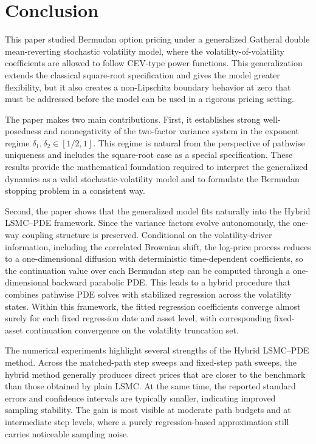 \documentclass[pdflatex,sn-mathphys-num]{sn-jnl}
\theoremstyle{thmstyleone}%
\theoremstyle{thmstylethree}%
\theoremstyle{thmstyletwo}%
\begin{document}
\section{Conclusion}\label{sec:conclusion}
This paper studied Bermudan option pricing under a generalized Gatheral double mean-reverting stochastic volatility model, where the volatility-of-volatility coefficients are allowed to follow CEV-type power functions. This generalization extends the classical square-root specification and gives the model greater flexibility, but it also creates a non-Lipschitz boundary behavior at zero that must be addressed before the model can be used in a rigorous pricing setting.

The paper makes two main contributions. First, it establishes strong well-posedness and nonnegativity of the two-factor variance system in the exponent regime $\delta_1, \delta_2 \in [1/2,1]$. This regime is natural from the perspective of pathwise uniqueness and includes the square-root case as a special specification. These results provide the mathematical foundation required to interpret the generalized dynamics as a valid stochastic-volatility model and to formulate the Bermudan stopping problem in a consistent way.

Second, the paper shows that the generalized model fits naturally into the Hybrid LSMC--PDE framework. Since the variance factors evolve autonomously, the one-way coupling structure is preserved. Conditional on the volatility-driver information, including the correlated Brownian shift, the log-price process reduces to a one-dimensional diffusion with deterministic time-dependent coefficients, so the continuation value over each Bermudan step can be computed through a one-dimensional backward parabolic PDE. This leads to a hybrid procedure that combines pathwise PDE solves with stabilized regression across the volatility states. Within this framework, the fitted regression coefficients converge almost surely for each fixed regression date and asset level, with corresponding fixed-asset continuation convergence on the volatility truncation set.

The numerical experiments highlight several strengths of the Hybrid LSMC--PDE method. Across the matched-path step sweeps and fixed-step path sweeps, the hybrid method generally produces direct prices that are closer to the benchmark than those obtained by plain LSMC. At the same time, the reported standard errors and confidence intervals are typically smaller, indicating improved sampling stability. The gain is most visible at moderate path budgets and at intermediate step levels, where a purely regression-based approximation still carries noticeable sampling noise.
\end{document}
